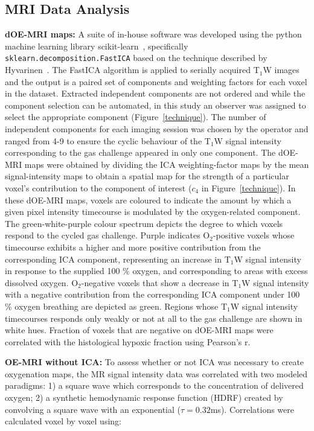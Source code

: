 \subsection{MRI Data Analysis}
\textbf{dOE-MRI maps:} A suite of in-house software was developed using the python machine learning library scikit-learn~\cite{Pedregosa:2011tv}, specifically \texttt{sklearn.decomposition.FastICA} based on the technique described by Hyvarinen~\cite{Hyvarinen:2000vk}.
The FastICA algorithm is applied to serially acquired T$_1$W images and the output is a paired set of components and weighting factors for each voxel in the dataset.
Extracted independent components are not ordered and while the component selection can be automated, in this study an observer was assigned to select the appropriate component (Figure~\ref{technique}).
The number of independent components for each imaging session was chosen by the operator and ranged from 4-9 to ensure the cyclic behaviour of the T$_1$W signal intensity corresponding to the gas challenge appeared in only one component. 
The dOE-MRI maps were obtained by dividing the ICA weighting-factor maps by the mean signal-intensity maps to obtain a spatial map for the strength of a particular voxel's contribution to the component of interest ($c_4$ in Figure~\ref{technique}).
In these dOE-MRI maps, voxels are coloured to indicate the amount by which a given pixel intensity timecourse is modulated by the oxygen-related component.  
The green-white-purple colour spectrum depicts the degree to which voxels respond to the cycled gas challenge.
Purple indicates O$_2$-positive voxels whose timecourse exhibits a higher and more positive contribution from the corresponding ICA component, representing an increase in T$_1$W signal intensity in response to the supplied 100 \% oxygen, and corresponding to areas with excess dissolved oxygen. 
O$_2$-negative voxels that show a decrease in T$_1$W signal intensity with a negative contribution from the corresponding ICA component under 100 \% oxygen breathing are depicted as green. 
Regions whose T$_1$W signal intensity timecourses responds only weakly or not at all to the gas challenge are shown in white hues.
Fraction of voxels that are negative on dOE-MRI maps were correlated with the histological hypoxic fraction using Pearson's r.

\noindent\textbf{OE-MRI without ICA:} To assess whether or not ICA was necessary to create oxygenation maps, the MR signal intensity data was correlated with two modeled paradigms: 1) a square wave which corresponds to the concentration of delivered oxygen; 2) a synthetic hemodynamic response function (HDRF) created by convolving a square wave with an exponential ($\tau=0.32$ms).
Correlations were calculated voxel by voxel using:

